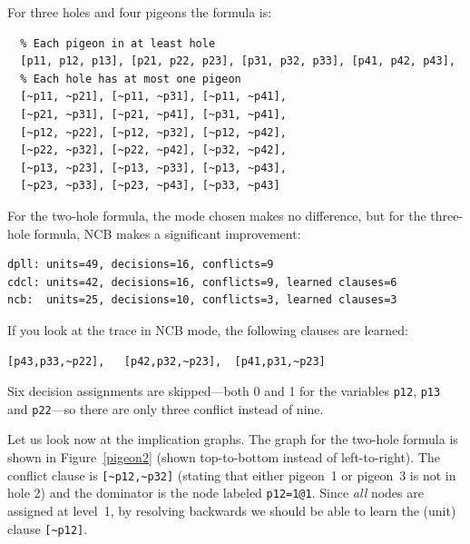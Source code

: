\documentclass[11pt]{report}
\newcommand*{\p}[1]{\textup{\texttt{#1}}}
\begin{document}
\newpage

For three holes and four pigeons the formula is:

\begin{verbatim}
  % Each pigeon in at least hole
  [p11, p12, p13], [p21, p22, p23], [p31, p32, p33], [p41, p42, p43], 
  % Each hole has at most one pigeon
  [~p11, ~p21], [~p11, ~p31], [~p11, ~p41],
  [~p21, ~p31], [~p21, ~p41], [~p31, ~p41],
  [~p12, ~p22], [~p12, ~p32], [~p12, ~p42],
  [~p22, ~p32], [~p22, ~p42], [~p32, ~p42],
  [~p13, ~p23], [~p13, ~p33], [~p13, ~p43],
  [~p23, ~p33], [~p23, ~p43], [~p33, ~p43]
\end{verbatim}

For the two-hole formula, the mode chosen makes no difference, but for
the three-hole formula, NCB makes a significant improvement:

\begin{verbatim}
dpll: units=49, decisions=16, conflicts=9
cdcl: units=42, decisions=16, conflicts=9, learned clauses=6
ncb:  units=25, decisions=10, conflicts=3, learned clauses=3
\end{verbatim}

If you look at the trace in NCB mode, the following clauses are
learned:

\begin{verbatim}
[p43,p33,~p22],   [p42,p32,~p23],  [p41,p31,~p23]
\end{verbatim}

Six decision assignments are skipped---both 0 and 1 for the variables
\p{p12}, \p{p13} and \p{p22}---so there are only three conflict instead
of nine.

Let us look now at the implication graphs. The graph for the two-hole
formula is shown in Figure~\ref{pigeon2} (shown top-to-bottom instead of
left-to-right). The conflict clause is \verb+[~p12,~p32]+ (stating
that either pigeon~1 or pigeon~3 is not in hole 2) and the
dominator is the node labeled \verb+p12=1@1+. Since \emph{all} nodes
are assigned at level~1, by resolving backwards we should be able to
learn the (unit) clause \verb+[~p12]+.
\end{document}
